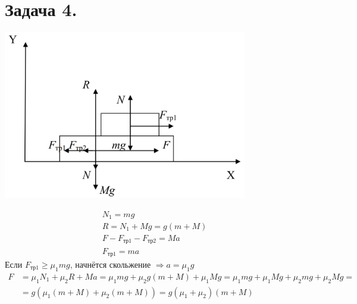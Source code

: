\documentclass[12pt]{article}
\begin{document}
\begin{sloppypar}
    \section*{Задача 4.}
    \includegraphics[width=0.8\textwidth]{graphics/task_04.png}

    \[
        \begin{array}{l}
            N_1 = mg                               \\
            R = N_1 + Mg = g(m + M)                \\
            F - F_{\text{тр1}} - F_\text{тр2} = Ma \\
            F_\text{тр1} = ma
        \end{array}
    \]
    Если $F_\text{тр1} \geq \mu_1mg$, начнётся скольжение $\Rightarrow a = \mu_1g$
    \[
        \begin{array}{ll}
            F & = \mu_1N_1 + \mu_2R + Ma = \mu_1mg + \mu_2g(m + M) + \mu_1Mg = \mu_1mg + \mu_1Mg + \mu_2mg + \mu_2Mg = \\
              & = g(\mu_1(m + M) + \mu_2(m + M)) = g(\mu_1 + \mu_2)(m + M)
        \end{array}
    \]

\end{sloppypar}
\end{document}
